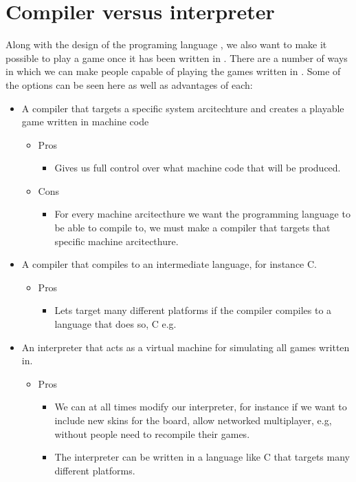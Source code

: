\section{Compiler versus interpreter}

Along with the design of the programing language \productname{}, we also want to make it possible to play a game once it has been written in \productname{}. There are a number of ways in which we can make people capable of playing the games written in \productname{}. Some of the options can be seen here as well as advantages of each:
\begin{itemize}
\item A \productname{} compiler that targets a specific system arcitechture and creates a playable game written in machine code
	\begin{itemize}
	\item Pros
		\begin{itemize}	
		\item Gives us full control over what machine code that will be produced.
		\end{itemize}
	\item Cons
		\begin{itemize}	
		\item For every machine arcitecthure we want the \productname{} programming language to be able to compile to, we must make a compiler that targets that specific machine arcitecthure.
		\end{itemize}
	\end{itemize}
\item A \productname{} compiler that compiles to an intermediate language, for instance C.
	\begin{itemize}
	\item Pros
		\begin{itemize}
		\item Lets \productname{} target many different platforms if the compiler compiles to a language that does so, C e.g.
		\end{itemize}
	\end{itemize}
\item An interpreter that acts as a virtual machine for simulating all games written in.
	\begin{itemize}
	\item Pros
		\begin{itemize}
		\item We can at all times modify our interpreter, for instance if we want to include new skins for the board, allow networked multiplayer, e.g, without people need to recompile their games. 
		\item The interpreter can be written in a language like C that targets many different platforms.
		\end{itemize}
	\end{itemize}
\end{itemize}